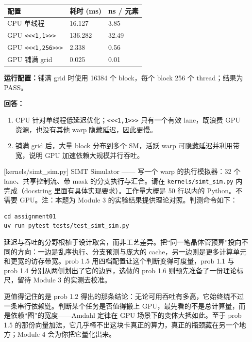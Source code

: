 \documentclass[11pt,a4paper,fontset=windows]{ctexart}
\begin{document}
\begin{center}\small
\begin{tabular}{@{}lll@{}}
\toprule
配置 & 耗时 (ms) & ns / 元素 \\
\midrule
CPU 单线程 & 16.127 & 3.85 \\
GPU \texttt{<<<1,1>>>} & 136.282 & 32.49 \\
GPU \texttt{<<<1,256>>>} & 2.338 & 0.56 \\
GPU 铺满 grid & 0.025 & 0.01 \\
\bottomrule
\end{tabular}
\end{center}

\par\textbf{运行配置：}铺满 grid 时使用 16384 个 block，每个 block 256 个 thread；结果为 PASS。

\par\textbf{回答：}
\begin{enumerate}[label=(\alph*)]
  \item CPU 针对单线程低延迟优化；\texttt{<<<1,1>>>} 只有一个有效 lane，既浪费 GPU 资源，也没有其他 warp 隐藏延迟，因此更慢。
  \item 铺满 grid 后，大量 block 分布到多个 SM，活跃 warp 可隐藏延迟并利用带宽，说明 GPU 加速依赖大规模并行吞吐。
\end{enumerate}

[kernels/simt\_sim.py]
SIMT Simulator —— 写一个 warp 的执行模拟器：32 个 lane、共享控制流、带 mask 的分支执行与汇合。请在 \texttt{kernels/simt\_sim.py} 内完成（docstring 里面有具体实现要求）。工作量大概是 50 行以内的 Python。不需要 GPU。注：本题为 Module 3 的实验结果提供理论对照。判测命令如下：

\begin{lstlisting}
cd assignment01
uv run pytest tests/test_simt_sim.py
\end{lstlisting}

\begin{lookback}
延迟与吞吐的分野根植于设计取舍，而非工艺差异。把“同一笔晶体管预算”投向不同的方向：一边是乱序执行、分支预测与庞大的 cache，另一边则是更多计算单元和更宽的访存带宽。prob 1.5 用四档配置让这个判断变得可度量，prob 1.1 与 prob 1.4 分别从两侧划出了它的边界，选做的 prob 1.6 则预先准备了一份理论标尺，留待 Module 3 的实测去校准。

更值得记住的是 prob 1.2 得出的那条结论：无论可用吞吐有多高，它始终绕不过一条串行依赖链。判断某个任务是否值得搬上 GPU，最先看的不是总计算量，而是依赖“图”的宽度——Amdahl 定律在 GPU 场景下的变体大抵如此。至于 prob 1.5 的那份向量加法，它几乎榨不出这块卡真正的算力，真正的瓶颈藏在另一个地方；Module 4 会为你把它量化出来。
\end{lookback}
\end{document}
